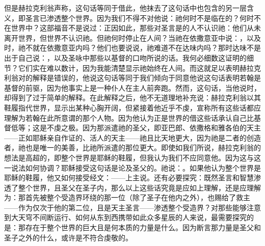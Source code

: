但是赫拉克利翁声称，这句话等同于借此，他抹去了这句话中也包含的另一层含义，即圣言已渗透整个世界。因为我们不得不对他说：祂何时不是临在的？何时不在世界中？这部福音不是说过：正因如此，那些对圣言是的人不认识祂：他们从未离开世界，但世界不认识祂。但祂何时停止在人间？当祂在依撒意亚中说：，以及时，祂不就在依撒意亚内吗？他们也要说说，祂难道不在达味内吗？那时达味不是出于自己说：，以及圣咏中那些以基督的口吻所说的话。我何必细数这证明的细节？它们实在难以数计，因为我能清楚显示祂始终在人间。而这就足以表明赫拉克利翁对的解释是错误的，他说这句话等同于我们倾向于同意他说这句话表明若翰是基督的前驱，因为他事实上是一种仆人在主人前奔跑。然而，这句话，当他说时，却得到了过于简单的解释。在此解释之后，他不无道理地补充说：赫拉克利翁以其鞋履指代世界，显示出某种心胸开阔，但紧接着他近乎不虔，宣称所有这些话都应理解为若翰在此所意谓的那个人物。因为他认为正是世界的借这些话承认自己比基督低等；这是不虔之极。因为那派遣祂的圣父，即亚巴郎、依撒格和雅各伯的天主——正如耶稣亲自作证的、活人的天主——祂且比天地更大，因为祂是二者的创造者，祂也是唯一的美善，比祂所派遣的那位更大。即使如我们所说，赫拉克利翁的想法是高超的，即整个世界是耶稣的鞋履，但我认为我们不应同意他。因为这与这一说法如何协调？耶稣接受这句话是论及圣父的。祂说：。如果他认为整个世界是耶稣的鞋履，他又如何接受经文：——上主说。还有必要探究：既然圣言和智慧渗透了整个世界，且圣父在圣子内，那么以上这些话究竟是应如上理解，还是应理解为：那首先被整个受造界环绕的那一位（除了圣子在他内之外），也赐给了救主——作为仅次于他的第二位，且是天主圣言——渗透整个受造界？对那些能够注意到大天穹不间断运行、如何从东到西携带如此众多星辰的人来说，最需要探究的是：那存在于整个世界的巨大且是何本质的力量是什么。因为断言那力量是圣父和圣子之外的什么，或许是不符合虔敬的。\par


